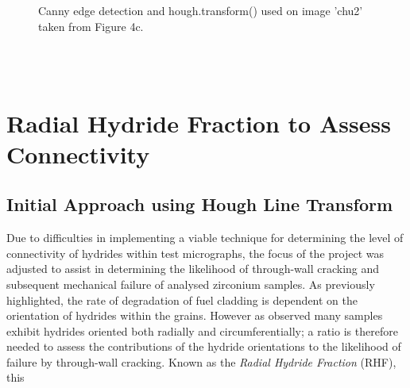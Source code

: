 \documentclass{article}
\begin{document}
	\begin{figure}[h]
		\centering
		\hfill
		\caption{Canny edge detection and hough.transform() used on image 'chu2' taken from Figure 4c. }
		\label{Skeletonise2}
	\end{figure}
	\\
\pagebreak
\\
\section{Radial Hydride Fraction to Assess Connectivity}
\subsection{Initial Approach using Hough Line Transform}

Due to difficulties in implementing a viable technique for determining the level of connectivity of hydrides within test micrographs, the focus of the project was adjusted to assist in determining the likelihood of through-wall cracking and subsequent mechanical failure of analysed zirconium samples. As previously highlighted, the rate of degradation of fuel cladding is dependent on the orientation of hydrides within the grains. However as observed many samples exhibit hydrides oriented both radially and circumferentially; a ratio is therefore needed to assess the contributions of the hydride orientations to the likelihood of failure by through-wall cracking. Known as the \textit{Radial Hydride Fraction} (RHF), this
\end{document}
